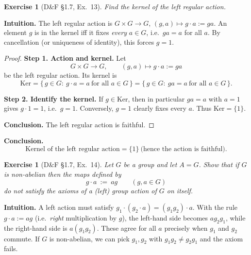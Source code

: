\documentclass[12pt]{article}
\newtheorem{exercise}[theorem]{Exercise}
\theoremstyle{definition}
\begin{document}
\newpage

\begin{exercise}[D\&F §1.7, Ex.~13]
Find the kernel of the left regular action.
\end{exercise}

\dotfill

\noindent\textbf{Intuition.}
The left regular action is $G\times G\to G$, $(g,a)\mapsto g\cdot a:=ga$.
An element $g$ is in the kernel iff it fixes \emph{every} $a\in G$, i.e.\ $ga=a$ for all $a$.
By cancellation (or uniqueness of identity), this forces $g=1$.

\dotfill

\begin{proof}
\noindent\textbf{Step 1. Action and kernel.}
Let
\[
G\times G \longrightarrow G,\qquad (g,a)\longmapsto g\cdot a:=ga
\]
be the left regular action. Its kernel is
\[
\mathrm{Ker}=\{\,g\in G:\ g\cdot a=a\ \text{for all }a\in G\,\}
=\{\,g\in G:\ ga=a\ \text{for all }a\in G\,\}.
\]

\noindent\textbf{Step 2. Identify the kernel.}
If $g\in\mathrm{Ker}$, then in particular $ga=a$ with $a=1$ gives $g\cdot 1=1$, i.e.\ $g=1$.
Conversely, $g=1$ clearly fixes every $a$. Thus $\mathrm{Ker}=\{1\}$.

\noindent\textbf{Conclusion.} The left regular action is faithful.
\end{proof}

\noindent\textbf{Conclusion.}
\[
\boxed{\,\text{Kernel of the left regular action}=\{1\}\ \text{(hence the action is faithful).}\,}
\]

\newpage

\begin{exercise}[D\&F §1.7, Ex.~14]
Let $G$ be a group and let $A=G$. Show that if $G$ is non-abelian then the maps defined by
\[
g\cdot a \ :=\ a g \qquad (g,a\in G)
\]
do \emph{not} satisfy the axioms of a (left) group action of $G$ on itself.
\end{exercise}

\dotfill

\noindent\textbf{Intuition.}
A left action must satisfy $g_1\cdot(g_2\cdot a)=(g_1g_2)\cdot a$. With the rule $g\cdot a:=ag$
(i.e.\ \emph{right} multiplication by $g$), the left-hand side becomes $a g_2 g_1$, while the right-hand side is $a(g_1g_2)$.
These agree for all $a$ precisely when $g_1$ and $g_2$ commute. If $G$ is non-abelian,
we can pick $g_1,g_2$ with $g_1g_2\ne g_2g_1$ and the axiom fails.
\end{document}
